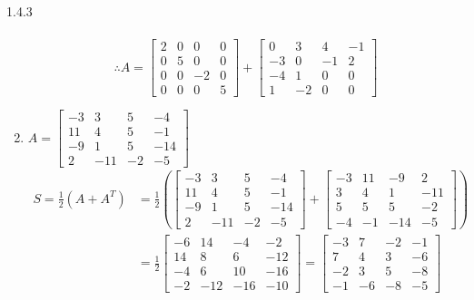 \documentclass{article}
\theoremstyle{definition}
\begin{document}
\begin{prob}{1.4.3}
\begin{enumerate}[label=(\alph*)]
\begin{align*}
				\end{align*}
				$$ \therefore \boxed{ A = \begin{bmatrix} 2 & 0 & 0 & 0 \\ 0 & 5 & 0 & 0 \\ 0 & 0 & -2 & 0 \\ 0 & 0 & 0 & 5 \end{bmatrix} + \begin{bmatrix} 0 & 3 & 4 & -1 \\ -3 & 0 & -1 & 2 \\ -4 & 1 & 0 & 0 \\ 1 & -2 & 0 & 0 \end{bmatrix} } $$	
				
			\item $ A = \begin{bmatrix} -3 & 3 & 5 & -4 \\ 11 & 4 & 5 & -1 \\ -9 & 1 & 5 & -14 \\ 2 & -11 & -2 & -5 \end{bmatrix} $
				\begin{align*}
					S = \frac{1}{2}(A+A^T) &= \frac{1}{2} \left( \begin{bmatrix} -3 & 3 & 5 & -4 \\ 11 & 4 & 5 & -1 \\ -9 & 1 & 5 & -14 \\ 2 & -11 & -2 & -5 \end{bmatrix} + \begin{bmatrix} -3 & 11 & -9 & 2 \\ 3 & 4 & 1 & -11 \\ 5 & 5 & 5 & -2 \\ -4 & -1 & -14 & -5 \end{bmatrix} \right) \\
					&= \frac{1}{2} \begin{bmatrix} -6 & 14 & -4 & -2 \\ 14 & 8 & 6 & -12 \\ -4 & 6 & 10 & -16 \\ -2 & -12 & -16 & -10 \end{bmatrix} = \begin{bmatrix} -3 & 7 & -2 & -1 \\ 7 & 4 & 3 & -6 \\ -2 & 3 & 5 & -8 \\ -1 & -6 & -8 & -5 \end{bmatrix} \\ \\

\end{align*}
\end{enumerate}
\end{prob}
\end{document}
